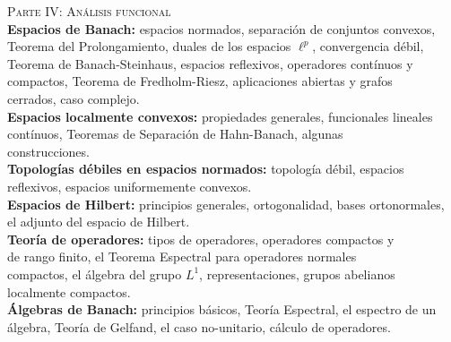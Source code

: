 \documentclass[12pt,letterpaper]{article}
\newcommand\tab[1][1.5cm]{\hspace*{#1}}
\begin{document}
\tab \textsc{Parte IV: Análisis funcional}\\
\tab \qquad \textbf{Espacios de Banach:} espacios normados, separación de conjuntos convexos, \\
 	\tab \qquad \qquad Teorema del Prolongamiento, duales de los espacios $\ell^p$, convergencia débil, \\
	\tab \qquad \qquad Teorema de Banach-Steinhaus, espacios reflexivos, operadores contínuos y \\
	\tab \qquad \qquad compactos, Teorema de Fredholm-Riesz, aplicaciones abiertas y grafos \\
	\tab \qquad \qquad cerrados, caso complejo.\\
\tab \qquad \textbf{Espacios localmente convexos:} propiedades generales, funcionales lineales \\
	\tab \qquad \qquad contínuos, Teoremas de Separación de Hahn-Banach, algunas \\
	\tab \qquad \qquad construcciones.\\
\tab \qquad \textbf{Topologías débiles en espacios normados:} topología débil, espacios \\
	\tab \qquad \qquad reflexivos, espacios uniformemente convexos.\\
\tab \qquad \textbf{Espacios de Hilbert:} principios generales, ortogonalidad, bases ortonormales, \\
	\tab \qquad \qquad el adjunto del espacio de Hilbert.\\
\tab \qquad \textbf{Teoría de operadores:} tipos de operadores, operadores compactos y \\
	\tab \qquad \qquad de rango finito, el Teorema Espectral para operadores normales \\
	\tab \qquad \qquad compactos, el álgebra del grupo $L^1$, representaciones, grupos abelianos \\
	\tab \qquad \qquad localmente compactos.\\
\tab \qquad \textbf{Álgebras de Banach:} principios básicos, Teoría Espectral, el espectro de un \\
	\tab \qquad \qquad álgebra, Teoría de Gelfand, el caso no-unitario, cálculo de operadores.\\ 
	
\end{document}

